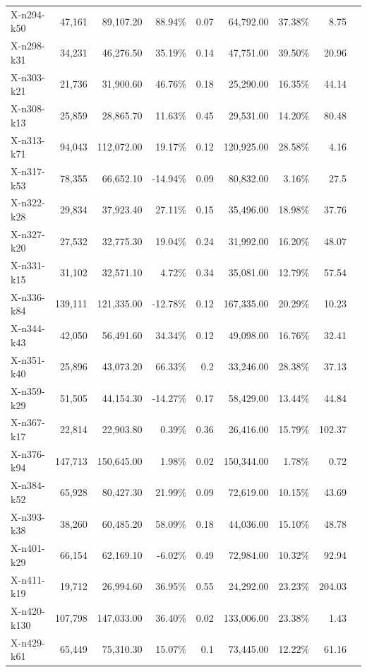 \documentclass[12pt,a4paper]{article}
\begin{document}
\begin{longtable}{@{}lrrrrrrrr@{}}
    X-n294-k50 & 47,161 & 89,107.20 & 88.94\% & 0.07 & 64,792.00 & 37.38\% & 8.75 \\
    X-n298-k31 & 34,231 & 46,276.50 & 35.19\% & 0.14 & 47,751.00 & 39.50\% & 20.96 \\
    X-n303-k21 & 21,736 & 31,900.60 & 46.76\% & 0.18 & 25,290.00 & 16.35\% & 44.14 \\
    X-n308-k13 & 25,859 & 28,865.70 & 11.63\% & 0.45 & 29,531.00 & 14.20\% & 80.48 \\
    X-n313-k71 & 94,043 & 112,072.00 & 19.17\% & 0.12 & 120,925.00 & 28.58\% & 4.16 \\
    X-n317-k53 & 78,355 & 66,652.10 & -14.94\% & 0.09 & 80,832.00 & 3.16\% & 27.5 \\
    X-n322-k28 & 29,834 & 37,923.40 & 27.11\% & 0.15 & 35,496.00 & 18.98\% & 37.76 \\
    X-n327-k20 & 27,532 & 32,775.30 & 19.04\% & 0.24 & 31,992.00 & 16.20\% & 48.07 \\
    X-n331-k15 & 31,102 & 32,571.10 & 4.72\% & 0.34 & 35,081.00 & 12.79\% & 57.54 \\
    X-n336-k84 & 139,111 & 121,335.00 & -12.78\% & 0.12 & 167,335.00 & 20.29\% & 10.23 \\
    X-n344-k43 & 42,050 & 56,491.60 & 34.34\% & 0.12 & 49,098.00 & 16.76\% & 32.41 \\
    X-n351-k40 & 25,896 & 43,073.20 & 66.33\% & 0.2 & 33,246.00 & 28.38\% & 37.13 \\
    X-n359-k29 & 51,505 & 44,154.30 & -14.27\% & 0.17 & 58,429.00 & 13.44\% & 44.84 \\
    X-n367-k17 & 22,814 & 22,903.80 & 0.39\% & 0.36 & 26,416.00 & 15.79\% & 102.37 \\
    X-n376-k94 & 147,713 & 150,645.00 & 1.98\% & 0.02 & 150,344.00 & 1.78\% & 0.72 \\
    X-n384-k52 & 65,928 & 80,427.30 & 21.99\% & 0.09 & 72,619.00 & 10.15\% & 43.69 \\
    X-n393-k38 & 38,260 & 60,485.20 & 58.09\% & 0.18 & 44,036.00 & 15.10\% & 48.78 \\
    X-n401-k29 & 66,154 & 62,169.10 & -6.02\% & 0.49 & 72,984.00 & 10.32\% & 92.94 \\
    X-n411-k19 & 19,712 & 26,994.60 & 36.95\% & 0.55 & 24,292.00 & 23.23\% & 204.03 \\
    X-n420-k130 & 107,798 & 147,033.00 & 36.40\% & 0.02 & 133,006.00 & 23.38\% & 1.43 \\
    X-n429-k61 & 65,449 & 75,310.30 & 15.07\% & 0.1 & 73,445.00 & 12.22\% & 61.16 \\

\end{longtable}
\end{document}
